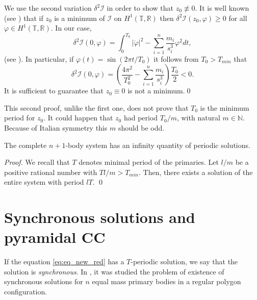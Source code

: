 \documentclass[smallcondensed]{svjour3}
\newcommand{\rr}{\mathbb{R}}
\begin{document}
\begin{remark}
We use the second variation $\delta^2 \mathcal{I}$ in order to show  that $z_0\nequiv 0$. It is well known (see \cite[Th. 1.3.1]{jost1998calculus}) that if $z_0$ is a minimum of $\mathcal{I}$ on $H^1(\mathbb{T},\rr)$  then $\delta^2 \mathcal{I} (z_0,\varphi)\geq 0$ for all $\varphi\in H^1(\mathbb{T},\rr)$. In our case,
\[\delta^2\mathcal{I}(0,\varphi)=\int_0^{T_0} |\dot{\varphi}|^2-\sum_{i=1}^{n}\frac{m_i}{s_i^3}\varphi^2 dt,\]
(see \cite[Eq. 1.3.6]{jost1998calculus}). In particular, if $\varphi(t)=\sin (2\pi t/T_0)$ it follows from $T_0>T_{min}$  that
\begin{equation}\label{eq:form.delta2}
 \delta^2 \mathcal{I} (0,\varphi)=\left( \frac{4\pi^2}{T_0^2}-\sum_{i=1}^{n}\frac{m_i}{s_i^3} \right)\frac{T_0}{2}<0.
\end{equation}
It is sufficient  to guarantee that $z_0\equiv 0$ is not a minimum.\qed


This second proof, unlike the first one, does not prove that $T_0$ is the minimum period for $z_0$. It could happen that $z_0$ had period $T_0/m$, with natural $m\in\mathbb{N}$. Because of Italian symmetry this $m$ should be odd.
\end{remark}






\begin{corollary}\label{cor:sol.periodica.sist.completo}
The complete $n+1$-body system has an infinity quantity of periodic solutions.
\end{corollary}
\begin{proof} We recall that $T$ denotes minimal period of the primaries.
Let $l/m$  be a positive rational number with $Tl/m>T_{min}$. Then, there exists a solution of the entire system with period $lT$.
\qed\end{proof}





\section{Synchronous solutions and pyramidal CC}\label{sec:sincro}



If the equation \eqref{eq:eq_new_red} has a $T$-periodic solution,  we say that the solution is \emph{synchronous}. In \cite{li2013characterization}, it was studied the problem of existence of synchronous solutions for $n$ equal mass primary bodies in a regular polygon configuration.
\end{document}
